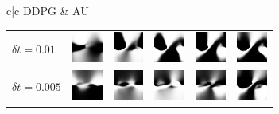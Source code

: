 \newcommand{\iw}{1cm}
\begin{figure}[!ht]
	\begin{tabular}{c|c}
		DDPG & AU \\
		\hline
		\begin{tabular}{l|lllll}
			$\delta t = 0.01$ & \includegraphics[width=\iw]{figs_data/pendulum/0.01/ddpg_act_2.png} &\includegraphics[width=\iw]{figs_data/pendulum/0.01/ddpg_act_4.png} &\includegraphics[width=\iw]{figs_data/pendulum/0.01/ddpg_act_6.png} &\includegraphics[width=\iw]{figs_data/pendulum/0.01/ddpg_act_8.png} &\includegraphics[width=\iw]{figs_data/pendulum/0.01/ddpg_act_10.png} \\
			$\delta t = 0.005$ &\includegraphics[width=\iw]{figs_data/pendulum/0.005/ddpg_act_4.png} &\includegraphics[width=\iw]{figs_data/pendulum/0.005/ddpg_act_8.png} &\includegraphics[width=\iw]{figs_data/pendulum/0.005/ddpg_act_12.png} &\includegraphics[width=\iw]{figs_data/pendulum/0.005/ddpg_act_16.png} &\includegraphics[width=\iw]{figs_data/pendulum/0.005/ddpg_act_20.png} \\

\end{tabular}
\end{tabular}
\end{figure}
